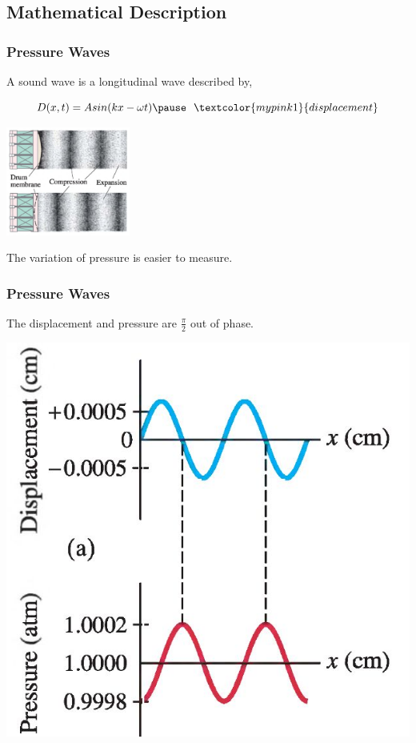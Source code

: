 \documentclass[]{beamer}
\begin{document}
\subsection{Mathematical Description}


\begin{frame}
\frametitle{Pressure Waves}

A sound wave is a longitudinal wave described by,

\pause

\begin{equation*}
D(x,t)=Asin(kx-\omega t) \pause ~~\textcolor{mypink1}{displacement}
\end{equation*}

\pause
  \begin{center}
  \includegraphics[height=1.4in]{images4/5.jpg}
\end{center}

\pause
The variation of pressure is easier to measure.
  \end{frame}


\begin{frame}
\frametitle{Pressure Waves}

The displacement and pressure are $\frac{\pi}{2}$ out of phase.
  \begin{center}
  \includegraphics[height=2.in]{images4/soundwave.jpg}
\end{center}

  \end{frame}
\end{document}
